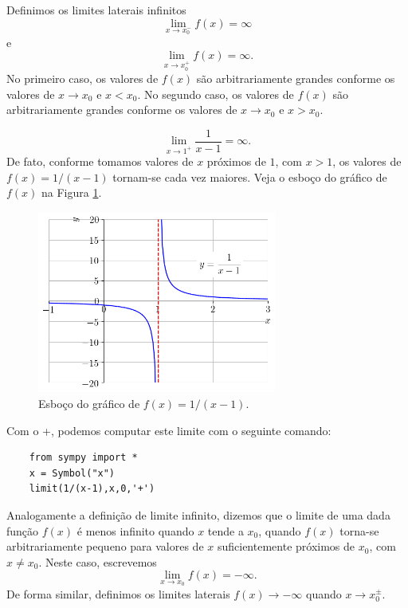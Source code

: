 Definimos os limites laterais infinitos
\begin{equation}
  \lim_{x\to x_0^-} f(x) = \infty
\end{equation}
e
\begin{equation}
  \lim_{x\to x_0^+} f(x) = \infty.
\end{equation}
No primeiro caso, os valores de $f(x)$ são arbitrariamente grandes conforme os valores de $x\to x_0$ e $x<x_0$. No segundo caso, os valores de $f(x)$ são arbitrariamente grandes conforme os valores de $x\to x_0$ e $x>x_0$.

\begin{ex}
  \begin{equation}
    \lim_{x\to 1^+} \frac{1}{x-1} = \infty.
  \end{equation}
  De fato, conforme tomamos valores de $x$ próximos de $1$, com $x>1$, os valores de $f(x) = 1/(x-1)$ tornam-se cada vez maiores. Veja o esboço do gráfico de $f(x)$ na Figura \ref{fig:ex_liminf_1x}.

\begin{figure}[H]
  \centering
  \includegraphics[width=0.7\textwidth]{./cap_lim/dados/fig_ex_liminf_1x/fig}
  \caption{Esboço do gráfico de $f(x)=1/(x-1)$.}
  \label{fig:ex_liminf_1x}
\end{figure}  

\ifispython
  Com o {\python}+{\sympy}, podemos computar este limite com o seguinte comando:
  \begin{lstlisting}
    from sympy import *
    x = Symbol("x")
    limit(1/(x-1),x,0,'+')
  \end{lstlisting}
\fi
\end{ex}


Analogamente a definição de limite infinito, dizemos que o limite de uma dada função $f(x)$ é menos infinito quando $x$ tende a $x_0$, quando $f(x)$ torna-se arbitrariamente pequeno para valores de $x$ suficientemente próximos de $x_0$, com $x\neq x_0$. Neste caso, escrevemos
\begin{equation}
  \lim_{x\to x_0} f(x) = -\infty.
\end{equation}
De forma similar, definimos os limites laterais $f(x)\to -\infty$ quando $x\to x_0^{\pm}$.

